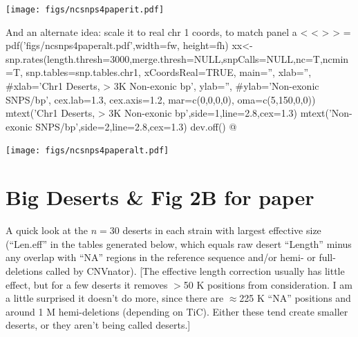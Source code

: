 \documentclass{article}\usepackage[]{graphicx}\usepackage[]{color}
\begin{document}
\texttt{[image: figs/ncsnps4paperit.pdf]}

And an alternate idea: scale it to real chr 1 coords, to match panel a
< < > > =
pdf('figs/ncsnps4paperalt.pdf',width=fw, height=fh)
xx<-snp.rates(length.thresh=3000,merge.thresh=NULL,snpCalls=NULL,nc=T,ncmin=T,
              snp.tables=snp.tables.chr1, 
              xCoordsReal=TRUE,
              main='', 
              xlab='', #xlab='Chr1 Deserts, > 3K Non-exonic bp', 
              ylab='', #ylab='Non-exonic SNPS/bp', 
              cex.lab=1.3,
              cex.axis=1.2,
              mar=c(0,0,0,0),
              oma=c(5,150,0,0))
mtext('Chr1 Deserts, > 3K Non-exonic bp',side=1,line=2.8,cex=1.3)
mtext('Non-exonic SNPS/bp',side=2,line=2.8,cex=1.3)
dev.off()
@

\texttt{[image: figs/ncsnps4paperalt.pdf]}

\fi

\section{Big Deserts \& Fig 2B for paper}

A quick look at the $n=30$ deserts in each strain with largest effective size (``Len.eff'' in the tables generated below, which equals raw desert ``Length'' minus any overlap with ``NA'' regions in the reference sequence and/or hemi- or full-deletions called by CNVnator).  [The effective length correction usually has little effect, but for a few deserts it removes $>$50 K positions from consideration.  I am a little surprised it doesn't do more, since there are $\approx$225 K ``NA'' positions and around 1 M hemi-deletions (depending on TiC).   Either these tend create smaller deserts, or they aren't being called deserts.] 
\end{document}
